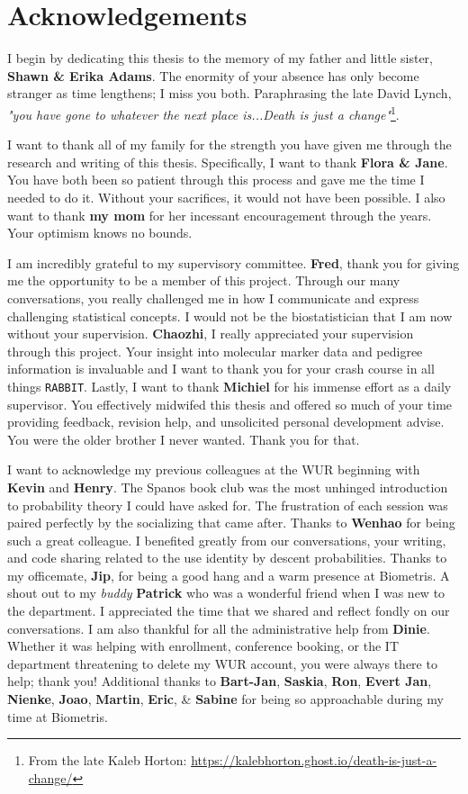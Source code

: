 \chapter*{Acknowledgements}

I begin by dedicating this thesis to the memory of my father and little sister, \textbf{Shawn \& Erika Adams}. The enormity of your absence has only become stranger as time lengthens; I miss you both. Paraphrasing the late David Lynch, \textit{"you have gone to whatever the next place is...Death is just a change"}\footnote{From the late Kaleb Horton: \url{https://kalebhorton.ghost.io/death-is-just-a-change/}}.

I want to thank all of my family for the strength you have given me through the research and writing of this thesis. Specifically, I want to thank \textbf{Flora \& Jane}. You have both been so patient through this process and gave me the time I needed to do it. Without your sacrifices, it would not have been possible. I also want to thank \textbf{my mom} for her incessant encouragement through the years. Your optimism knows no bounds.

I am incredibly grateful to my supervisory committee. \textbf{Fred}, thank you for giving me the opportunity to be a member of this project. Through our many conversations, you really challenged me in how I communicate and express challenging statistical concepts. I would not be the biostatistician that I am now without your supervision. \textbf{Chaozhi}, I really appreciated your supervision through this project. Your insight into molecular marker data and pedigree information is invaluable and I want to thank you for your crash course in all things \texttt{RABBIT}. Lastly, I want to thank \textbf{Michiel} for his immense effort as a daily supervisor. You effectively midwifed this thesis and offered so much of your time providing feedback, revision help, and unsolicited personal development advise. You were the older brother I never wanted. Thank you for that.

I want to acknowledge my previous colleagues at the WUR beginning with \textbf{Kevin} and \textbf{Henry}. The Spanos book club was the most unhinged introduction to probability theory I could have asked for. The frustration of each session was paired perfectly by the socializing that came after. Thanks to \textbf{Wenhao} for being such a great colleague. I benefited greatly from our conversations, your writing, and code sharing related to the use identity by descent probabilities. Thanks to my officemate, \textbf{Jip}, for being a good hang and a warm presence at Biometris. A shout out to my \textit{buddy} \textbf{Patrick} who was a wonderful friend when I was new to the department. I appreciated the time that we shared and reflect fondly on our conversations. I am also thankful for all the administrative help from \textbf{Dinie}. Whether it was helping with enrollment, conference booking, or the IT department threatening to delete my WUR account, you were always there to help; thank you! Additional thanks to \textbf{Bart-Jan}, \textbf{Saskia}, \textbf{Ron}, \textbf{Evert Jan}, \textbf{Nienke}, \textbf{Joao}, \textbf{Martin}, \textbf{Eric}, \& \textbf{Sabine} for being so approachable during my time at Biometris.

